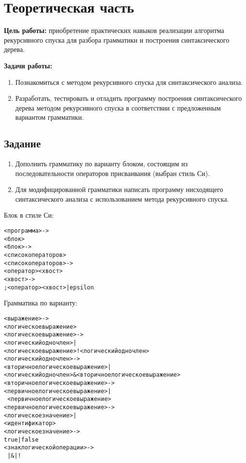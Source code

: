 \chapter{Теоретическая часть}

\textbf{Цель работы:} приобретение практических навыков реализации алгоритма рекурсивного спуска для разбора грамматики и построения синтаксического дерева.

\textbf{Задачи работы:}

\begin{enumerate}
	\item Познакомиться с методом рекурсивного спуска для синтаксического анализа.
	\item Разработать, тестировать и отладить программу построения синтаксического дерева методом рекурсивного спуска в соответствии с предложенным вариантом грамматики.
\end{enumerate}

\section{Задание}

\begin{enumerate}
	\item Дополнить грамматику по варианту блоком, состоящим из последовательности операторов присваивания (выбран стиль Си).
	\item Для модифицированной грамматики написать программу нисходящего синтаксического анализа с использованием метода рекурсивного спуска.
\end{enumerate}

Блок в стиле Си:

\begin{framed}
	\ttfamily 
	\begin{alltt}
<программа> -> 
    <блок>
<блок> -> 
    { <список операторов> }
<список операторов> ->
    <оператор> < хвост>
<хвост> ->
    ; <оператор> <хвост> | epsilon
\end{alltt}
\end{framed}

Грамматика по варианту:

\begin{framed}
	\ttfamily 
	\begin{alltt}
<выражение> ->
   <логическое выражение>
<логическое выражение> ->
    <логический одночлен> | 
    <логическое выражение> ! <логический одночлен>
<логический одночлен> ->
    <вторичное логическое выражение> | 
    <логический одночлен> \& <вторичное логическое выражение>
<вторичное логическое выражение> ->
    <первичное логическое выражение> |
    ~ <первичное логическое выражение>
<первичное логическое выражение> ->
    <логическое значение> |
<идентификатор>
    <логическое значение> ->
    true | false
<знак логической операции> ->
    ~ | & | !
\end{alltt}
\end{framed}

